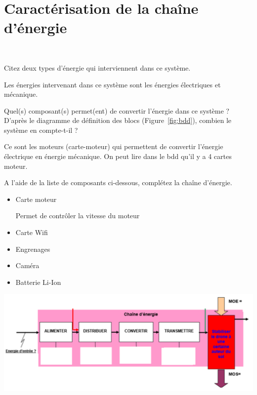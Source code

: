 \documentclass[10pt,fleqn]{article} %
\begin{document}
\section{Caractérisation de la chaîne d'énergie}
\begin{exercise}~

\begin{question}
  Citez deux types d'énergie qui interviennent dans ce système.
\end{question} 
\begin{solution}
  Les énergies intervenant dans ce système sont les énergies électriques et mécanique. 
\end{solution}

\begin{question}
    Quel(s) composant(s) permet(ent) de convertir l'énergie dans ce système ? D'après le diagramme de définition des blocs (Figure~\ref{fig:bdd}), combien le système en compte-t-il ? 
\end{question}
\begin{solution}
  Ce sont les moteurs (carte-moteur) qui permettent de convertir l'énergie électrique en énergie mécanique. On peut lire dans le bdd qu'il y a 4 cartes moteur. 
\end{solution}

\begin{question}
    A l'aide de la liste de composants ci-dessous, complétez la chaîne d'énergie. 
    \begin{itemize}
        \item Carte moteur
        \begin{itemize}
            \itemf Permet de contrôler la vitesse du moteur
        \end{itemize}
        \item Carte Wifi
        \item Engrenages
        \item Caméra
        \item Batterie Li-Ion
    \end{itemize}
    
    \includegraphics[width=\textwidth]{images/chaineenergie.png}
\end{question}
\end{exercise}
\pagebreak
\end{document}
